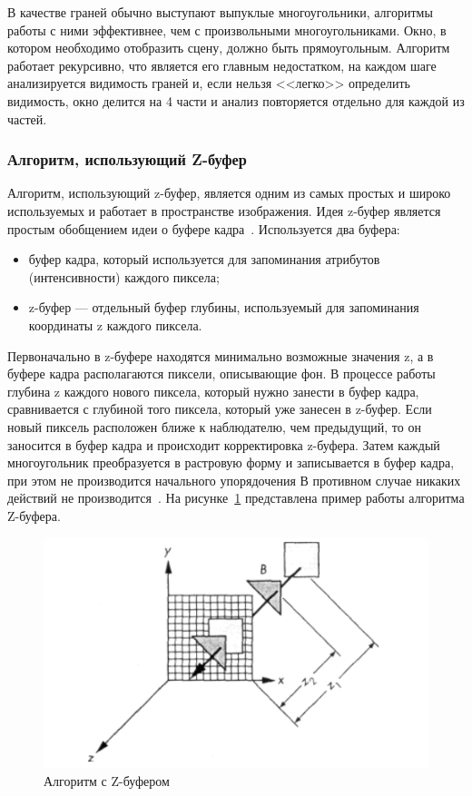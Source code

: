 В качестве граней обычно выступают выпуклые многоугольники, алгоритмы работы с ними эффективнее, чем с произвольными многоугольниками.
Окно, в котором необходимо отобразить сцену, должно быть прямоугольным. 
Алгоритм работает рекурсивно, что является его главным недостатком, на каждом шаге анализируется видимость граней и, если нельзя <<легко>> определить видимость, окно делится на 4 части и анализ повторяется отдельно для каждой из частей. 

\subsubsection{Алгоритм, использующий Z-буфер}

Алгоритм, использующий z-буфер, является одним из самых простых и широко используемых и работает в пространстве изображения.
Идея z-буфер является простым обобщением идеи о буфере кадра~\cite{roders}.
Используется два буфера:
\begin{itemize}
	\item буфер кадра, который используется для запоминания атрибутов (интенсивности) каждого пиксела;
	\item z-буфер --- отдельный буфер глубины, используемый для запоминания координаты z каждого пиксела.
\end{itemize}

Первоначально в z-буфере находятся минимально возможные значения z, а в буфере кадра располагаются пиксели, описывающие фон.
В процессе работы глубина z каждого нового пиксела, который нужно занести в буфер кадра, сравнивается с глубиной того пиксела, который уже занесен в z-буфер.
Если новый пиксель расположен ближе к наблюдателю, чем предыдущий, то он заносится в буфер кадра и происходит корректировка z-буфера. Затем каждый многоугольник преобразуется в растровую форму и записывается в буфер кадра, при этом не производится начального упорядочения
В противном случае никаких действий не производится~\cite{roders}.
На рисунке~\ref{img:z-buffer} представлена пример работы алгоритма Z-буфера.
\begin{figure}[h]
	\centering
	\includegraphics[height=0.3\textheight]{img/z-buffer.png}
	\caption{Алгоритм с Z-буфером}
	\label{img:z-buffer}
\end{figure}

